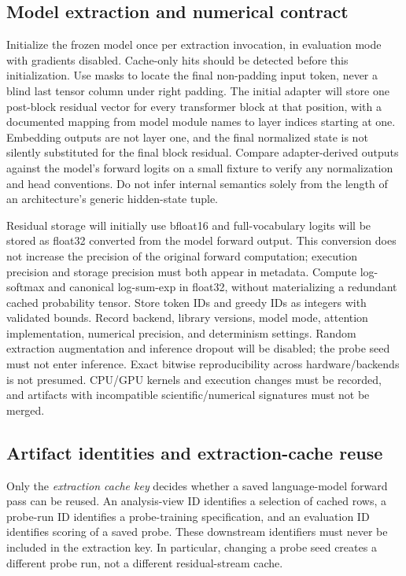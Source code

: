 \documentclass[11pt]{article}
\begin{document}
\subsection{Model extraction and numerical contract}

Initialize the frozen model once per extraction invocation, in evaluation mode with gradients disabled.
Cache-only hits should be detected before this initialization.
Use masks to locate the final non-padding input token, never a blind last tensor column under right padding.
The initial adapter will store one post-block residual vector for every transformer block at that position, with a documented mapping from model module names to layer indices starting at one.
Embedding outputs are not layer one, and the final normalized state is not silently substituted for the final block residual.
Compare adapter-derived outputs against the model's forward logits on a small fixture to verify any normalization and head conventions.
Do not infer internal semantics solely from the length of an architecture's generic hidden-state tuple.

Residual storage will initially use bfloat16 and full-vocabulary logits will be stored as float32 converted from the model forward output.
This conversion does not increase the precision of the original forward computation; execution precision and storage precision must both appear in metadata.
Compute log-softmax and canonical log-sum-exp in float32, without materializing a redundant cached probability tensor.
Store token IDs and greedy IDs as integers with validated bounds.
Record backend, library versions, model mode, attention implementation, numerical precision, and determinism settings.
Random extraction augmentation and inference dropout will be disabled; the probe seed must not enter inference.
Exact bitwise reproducibility across hardware/backends is not presumed.
CPU/GPU kernels and execution changes must be recorded, and artifacts with incompatible scientific/numerical signatures must not be merged.

\subsection{Artifact identities and extraction-cache reuse}

Only the \emph{extraction cache key} decides whether a saved language-model forward pass can be reused.
An analysis-view ID identifies a selection of cached rows, a probe-run ID identifies a probe-training specification, and an evaluation ID identifies scoring of a saved probe.
These downstream identifiers must never be included in the extraction key.
In particular, changing a probe seed creates a different probe run, not a different residual-stream cache.
\end{document}

